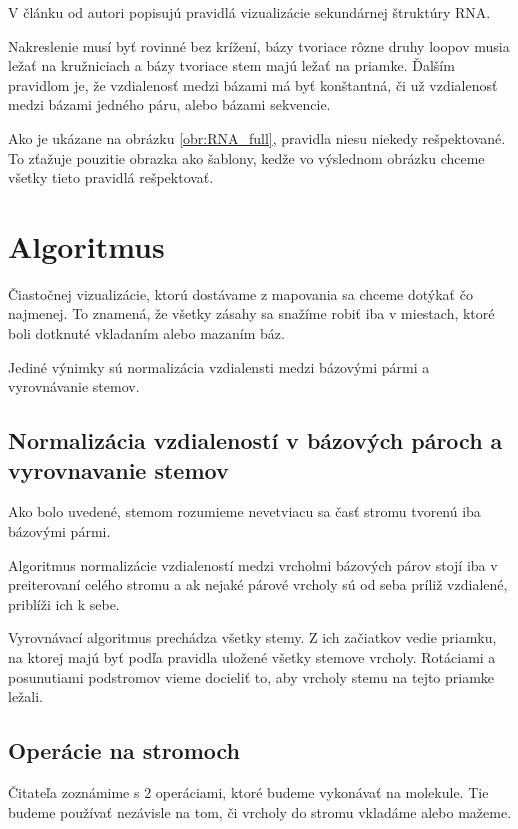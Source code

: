 V článku od \citet{RNA_DRAW} autori popisujú pravidlá vizualizácie sekundárnej štruktúry RNA.

Nakreslenie musí byť rovinné bez krížení, bázy tvoriace rôzne druhy loopov musia ležať na kružniciach
a bázy tvoriace stem majú ležať na priamke.
Ďalším pravidlom je, že vzdialenosť medzi bázami má byť konštantná, či už vzdialenosť medzi bázami jedného páru,
alebo bázami sekvencie.

Ako je ukázane na obrázku \ref{obr:RNA_full}, pravidla niesu niekedy rešpektované. To zťažuje pouzitie obrazka
ako šablony, kedže vo výslednom obrázku chceme všetky tieto pravidlá rešpektovať.

\section{Algoritmus}
Čiastočnej vizualizácie, ktorú dostávame z mapovania sa chceme dotýkať čo najmenej. To znamená,
že všetky zásahy sa snažíme robiť iba v miestach, ktoré boli dotknuté vkladaním alebo mazaním báz.

Jediné výnimky sú normalizácia vzdialensti medzi bázovými pármi a vyrovnávanie stemov.

\subsection{Normalizácia vzdialeností v bázových pároch a vyrovnavanie stemov}

Ako bolo uvedené, stemom rozumieme nevetviacu sa časť stromu tvorenú iba bázovými pármi.

Algoritmus normalizácie vzdialeností medzi vrcholmi bázových párov stojí iba v preiterovaní celého stromu
a ak nejaké párové vrcholy sú od seba príliž vzdialené, priblíži ich k sebe.

Vyrovnávací algoritmus prechádza všetky stemy. Z ich začiatkov vedie priamku, na ktorej majú byť podľa pravidla uložené
všetky stemove vrcholy. Rotáciami a posunutiami podstromov vieme docieliť to, aby vrcholy stemu na tejto priamke ležali.


\subsection{Operácie na stromoch}

Čitateľa zoznámime s 2 operáciami, ktoré budeme vykonávať na molekule. Tie budeme používať nezávisle
na tom, či vrcholy do stromu vkladáme alebo mažeme.

